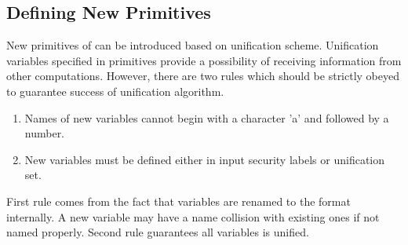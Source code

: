 \subsection{Defining New Primitives}
New primitives of  can be introduced based on unification scheme.
Unification variables specified in primitives provide a possibility of receiving information from 
other computations.
However, there are two rules which should be strictly obeyed to guarantee success of unification
algorithm.
\begin{enumerate}
\item Names of new variables cannot begin with a character 'a' and followed by a number.
\item New variables must be defined either in input security labels or unification set.
\end{enumerate}
First rule comes from the fact that variables are renamed to the format internally. A new variable may 
have a name collision with existing ones if not named properly. Second rule guarantees all variables
is unified.
